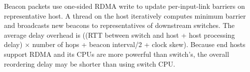 Beacon packets use one-sided RDMA write to update per-input-link barriers on representative host. A thread on the host iteratively computes minimum barrier and broadcasts new beacons to representatives of downstream switches.
The average delay overhead is ((RTT between switch and host + host processing delay) $\times$ number of hops + beacon interval/2 + clock skew). Because end hosts support RDMA and its CPUs are more powerful than switch's, the overall reordering delay may be shorter than using switch CPU.

